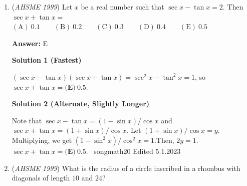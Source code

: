 \begin{enumerate}
 $\mathrm{(A) \ 7 } \qquad \mathrm{(B) \ 8 } \qquad \mathrm{(C) \ 9 } \qquad \mathrm{(D) \ 10 } \qquad \mathrm{(E) \ 11 }$

 \textbf{Answer: }A



\textbf{Solution}

Alina and Tina must sing more than $4$, but less than $7$, songs.  Therefore, Alina sang $5$ or $6$ songs, and Tina sang $5$ or $6$ songs, with $4$ possible combinations.

 
However, since every song is a trio, if you add up all the numbers of songs a person sang for all four singers, it must be divisible by $3$.  Thus, $7 + 4 + a + t$ must be divisible by $3$, and $a+t - 1$ must be divisible by $3$.  

 
Since $10 \le a+t \le 12$ by the bounds of $5 \le a, t \le 6$, we have $9 \le a + t - 1 \le 11$.  Because the middle number must be a multiple of $3$, we set $a + t - 1 = 9$, leading to $a + t = 10$ and $a = t = 5$.

 
So, the four girls sang $4, 5, 5$ and $7$ songs in trios.  That means there were $\frac{4 + 5 + 5 + 7}{3} = 7$ songs sung, and the answer is $\boxed{A}$.

 


	\item (\textit{AHSME 1999}) Let $x$ be a real number such that $\sec x - \tan x = 2$. Then $\sec x + \tan x =$
$\mathrm{(A) \ } 0.1 \qquad \mathrm{(B) \ } 0.2 \qquad \mathrm{(C) \ } 0.3 \qquad \mathrm{(D) \ } 0.4 \qquad \mathrm{(E) \ } 0.5$

 \textbf{Answer: }E



\textbf{Solution 1 (Fastest)}

$(\sec x - \tan x)(\sec x + \tan x) = \sec^{2} x - \tan^{2} x = 1$, so $\sec x + \tan x = \boxed{\textbf{(E)}\ 0.5}$.

 



\textbf{Solution 2 (Alternate, Slightly Longer)}

Note that $\sec x - \tan x = (1-\sin x)/\cos x$ and $\sec x + \tan x = (1+\sin x)/\cos x$. Let $(1+\sin x)/\cos x = y$. Multiplying, we get $(1-\sin^{2}x)/\cos^{2}x = 1$.Then, $2y = 1$. $\sec x + \tan x =  \boxed{\textbf{(E)}\ 0.5}$. ~songmath20  Edited 5.1.2023

 


	\item (\textit{AHSME 1999}) What is the radius of a circle inscribed in a rhombus with diagonals of length $10$ and $24$?



\end{enumerate}

